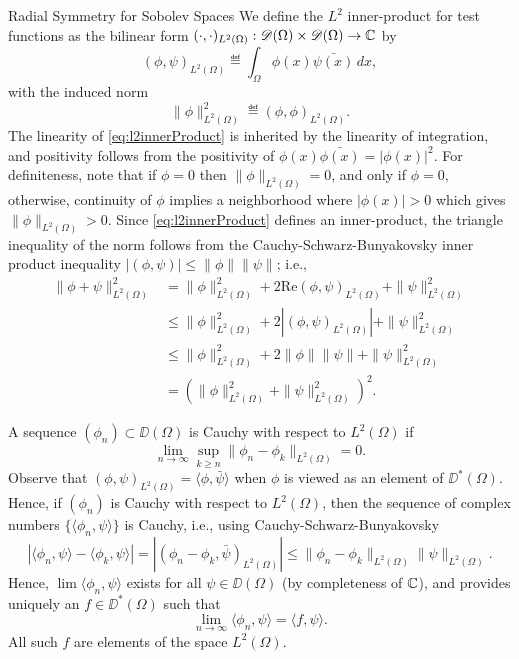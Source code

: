 \begin{chapter}{Radial Symmetry for Sobolev Spaces}
We define the $L^2$ inner-product for test functions as the bilinear form $(\cdot,\cdot)_{L^2(\Omega)}:\mathscr D(\Omega)\times\mathscr D(\Omega) \to \mathbb C$ by 
\begin{equation} \label{eq:l2innerProduct}
  (\phi,\psi)_{L^2(\Omega)} \eqdef \int_{\Omega} \phi(x)\bar{\psi(x)}\,dx,
\end{equation}
with the induced norm 
\begin{equation} \label{eq:l2norm}
  \|\phi\|^2_{L^2(\Omega)} \eqdef (\phi,\phi)_{L^2(\Omega)}.
\end{equation}
The linearity of \eqref{eq:l2innerProduct} is inherited by the linearity of integration, and positivity follows from the positivity of $\phi(x)\bar{\phi(x)} = |\phi(x)|^2$. 
For definiteness, note that if $\phi = 0$ then $\|\phi\|_{L^2(\Omega)} = 0$, and only if $\phi = 0$, otherwise, continuity of $\phi$ implies a neighborhood where $|\phi(x)| > 0$ which gives $\|\phi\|_{L^2(\Omega)} > 0$.
Since \eqref{eq:l2innerProduct} defines an inner-product, the triangle inequality of the norm follows from the Cauchy-Schwarz-Bunyakovsky inner product inequality $|(\phi,\psi)|\le \|\phi\|\|\psi\|$; i.e.,
\begin{align}
  \|\phi + \psi\|_{L^2(\Omega)}^2 
    &= \|\phi\|_{L^2(\Omega)}^2 + 2\mathrm{Re} (\phi,\psi)_{L^2(\Omega)}  + \|\psi\|_{L^2(\Omega)}^2 \nonumber\\
    &\le \|\phi\|_{L^2(\Omega)}^2 + 2|(\phi,\psi)_{L^2(\Omega)}|  + \|\psi\|_{L^2(\Omega)}^2 \nonumber\\
    &\le \|\phi\|_{L^2(\Omega)}^2 + 2\|\phi\|\|\psi\|  + \|\psi\|_{L^2(\Omega)}^2 \nonumber \\
    &= (\|\phi\|_{L^2(\Omega)}^2 + \|\psi\|_{L^2(\Omega)}^2)^2.
\end{align}

A sequence $(\phi_n)\subset \DD(\Omega)$ is Cauchy with respect to $L^2(\Omega)$ if
\begin{equation} 
  \lim_{n\to\infty}\sup_{k\ge n} \|\phi_n - \phi_k\|_{L^2(\Omega)} = 0.
\end{equation}
Observe that $(\phi,\psi)_{L^2(\Omega)} = \langle \phi,\bar{\psi}\rangle$ when $\phi$ is viewed as an element of $\DD^*(\Omega)$.
Hence, if $(\phi_n)$ is Cauchy with respect to $L^2(\Omega)$, then the sequence of complex numbers $\big\{\langle \phi_n,\psi\rangle\big\}$ is Cauchy, i.e., using Cauchy-Schwarz-Bunyakovsky
\begin{equation}
  |\langle \phi_n, \psi \rangle - \langle \phi_k,\psi\rangle| 
    = |(\phi_n - \phi_k,\bar{\psi})_{L^2(\Omega)}|  
    \le \|\phi_n - \phi_k\|_{L^2(\Omega)}\|\psi\|_{L^2(\Omega)}. \label{eq:cauchySchwarz}
\end{equation}
Hence, $\lim\langle \phi_n,\psi\rangle$ exists for all $\psi \in \DD(\Omega)$ (by completeness of $\mathbb C$), and  provides uniquely an $f \in \DD^*(\Omega)$ such that
\begin{equation}
  \lim_{n\to\infty} \langle \phi_n, \psi\rangle = \langle f,\psi\rangle.
\end{equation}
All such $f$ are elements of the space $L^2(\Omega)$.


\end{chapter}
